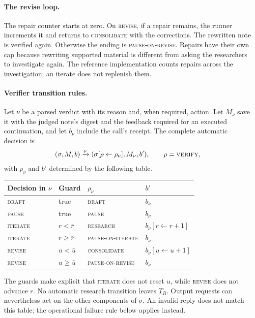\documentclass[11pt,a4paper]{article}
\newcommand{\st}[1]{\textsc{#1}}
\begin{document}
\paragraph{The revise loop.}
The repair counter starts at zero. On \st{revise}, if a repair remains, the
runner increments it and returns to \st{consolidate} with the corrections. The
rewritten note is verified again. Otherwise the ending is \st{pause-on-revise}.
Repairs have their own cap because rewriting supported material is different
from asking the researchers to investigate again. The reference implementation
counts repairs across the investigation; an iterate does not replenish them.

\paragraph{Verifier transition rules.}
Let \(\nu\) be a parsed verdict with its reason and, when required, action. Let
\(M_\nu\) save it with the judged note's digest and the feedback required for an
executed continuation, and let \(b_\nu\) include the call's receipt. The
complete automatic decision is
\[
 (\sigma,M,b)\xrightarrow{\nu}
 (\sigma[\rho\leftarrow\rho_\nu],M_\nu,b'),
 \qquad\rho=\st{verify},
\]
with \(\rho_\nu\) and \(b'\) determined by the following table.
\begin{center}
\begin{tabular}{llll}
\toprule
Decision in \(\nu\) & Guard & \(\rho_\nu\) & \(b'\) \\
\midrule
\st{draft} & true & \st{draft} & \(b_\nu\) \\
\st{pause} & true & \st{pause} & \(b_\nu\) \\
\st{iterate} & \(r<\bar r\) & \st{research} & \(b_\nu[r\leftarrow r+1]\) \\
\st{iterate} & \(r\geq\bar r\) & \st{pause-on-iterate} & \(b_\nu\) \\
\st{revise} & \(u<\bar u\) & \st{consolidate} & \(b_\nu[u\leftarrow u+1]\) \\
\st{revise} & \(u\geq\bar u\) & \st{pause-on-revise} & \(b_\nu\) \\
\bottomrule
\end{tabular}
\end{center}
The guards make explicit that \st{iterate} does not reset \(u\), while
\st{revise} does not advance \(r\). No automatic research transition leaves
\(T_R\). Output requests can nevertheless act on the other components of
\(\sigma\). An invalid reply does not match this table; the operational failure
rule below applies instead.
\end{document}
